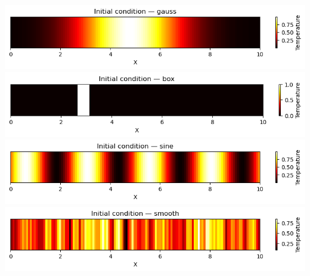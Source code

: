 \begin{secframe}
\small

\centering
\begin{minipage}[b]{0.80\linewidth}
    \includegraphics[width=\linewidth,keepaspectratio]{images/1DThemal/initial/gauss.png}
    \includegraphics[width=\linewidth,keepaspectratio]{images/1DThemal/initial/box.png}
    \includegraphics[width=\linewidth,keepaspectratio]{images/1DThemal/initial/sine.png}
    \includegraphics[width=\linewidth,keepaspectratio]{images/1DThemal/initial/random.png}
\end{minipage}

\end{secframe}


